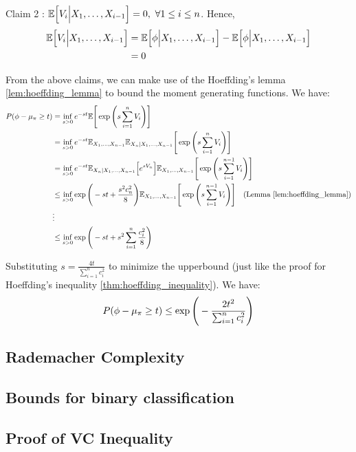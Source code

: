 \begin{proof*}
\begin{subproof}{\newline Claim 2 : $\mathbb{E}\Big[  V_i\Big| X_1, \dots, X_{i-1}  \Big] = 0, \ \forall 1 \le i \le n$.}
        \noindent Hence, 
        \begin{align*}
            \mathbb{E}\Big[  V_i\Big| X_1, \dots, X_{i-1}  \Big] &= \mathbb{E}\Big[ \phi\Big|X_1, \dots, X_{i-1} \Big] - \mathbb{E}\Big[ \phi\Big|X_1, \dots, X_{i-1} \Big] \\ &=0
        \end{align*}
    \end{subproof}

    \noindent From the above claims, we can make use of the Hoeffding's lemma \ref{lem:hoeffding_lemma} to bound the moment generating functions. We have:
    \begin{align*}
        P(\phi - \mu_\pi \ge t) 
        &= \inf_{s>0}e^{-st}\mathbb{E}\Bigg[ 
            \exp\Bigg( 
                s\sum_{i=1}^n V_i
             \Bigg)
         \Bigg] \\
        &= \inf_{s>0}e^{-st}\mathbb{E}_{X_1, \dots, X_{n-1}}\mathbb{E}_{X_n|X_1, \dots, X_{n-1}}\Bigg[ 
            \exp\Bigg( 
                s\sum_{i=1}^n V_i
             \Bigg)
         \Bigg] \\
        &= \inf_{s>0}e^{-st}\mathbb{E}_{X_n|X_1, \dots, X_{n-1}}\Big[ e^{sV_n} \Big]\mathbb{E}_{X_1, \dots, X_{n-1}}\Bigg[ 
            \exp\Bigg( 
                s\sum_{i=1}^{n-1} V_i
             \Bigg)
         \Bigg]\\
        &\le \inf_{s>0}\exp\Bigg( 
            -st + \frac{s^2c_n^2}{8}
         \Bigg)\mathbb{E}_{X_1, \dots, X_{n-1}}\Bigg[ 
            \exp\Bigg( 
                s\sum_{i=1}^{n-1} V_i
             \Bigg)
         \Bigg]  \ \ \ \text{(Lemma \ref{lem:hoeffding_lemma})} \\
        &\vdots \\
        &\le \inf_{s>0}\exp\Bigg( 
            -st + s^2 \sum_{i=1}^n \frac{c_i^2}{8}
         \Bigg)
    \end{align*}

    \noindent Substituting $s=\frac{4t}{\sum_{i=1}^n c_i^2}$ to minimize the upperbound (just like the proof for Hoeffding's inequality \ref{thm:hoeffding_inequality}). We have:
    \begin{align*}
        P(\phi - \mu_\pi \ge t) \le \exp\Bigg( 
            -\frac{2t^2}{\sum_{i=1}^n c_i^2}
         \Bigg)
    \end{align*}
\end{proof*}

\subsection{Rademacher Complexity}




\subsection{Bounds for binary classification}




\subsection{Proof of VC Inequality}
\label{sec:proof_of_vc_inequality}
